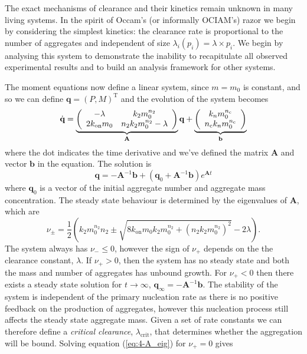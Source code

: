 The exact mechanisms of clearance and their kinetics remain unknown in many living systems. In the spirit of Occam's (or informally OCIAM's) razor we begin by considering the simplest kinetics: the clearance rate is proportional to the number of aggregates and independent of size $\lambda_i(p_i)=\lambda \times p_i$. We begin by analysing this system to demonstrate the inability to recapitulate all observed experimental results and to build an analysis framework for other systems.


The moment equations now define a linear system, since $m=m_0$ is constant, and so we can define $\textbf{q}=(P, M)^\text{T}$ and the evolution of the system becomes
\begin{equation}
    \dot{\textbf{q}} =
    \underbrace{\left(
    \begin{array}{cc}
    -\lambda & k_2 m_0^{n_2} \\
    2 k_\text{on}m_0 & n_2 k_2 m_0^{n_2}-\lambda  \\
    \end{array}
    \right)}
    _{\textbf{A}}
    \textbf{q}
    +
    \underbrace{\left(
    \begin{array}{c}
    k_n m_0^{n_{\mathrm{c}}} \\
    n_{\mathrm{c}} k_n m_0^{n_{\mathrm{c}}} \\
    \end{array}
    \right)}
    _{\textbf{b}}
    \label{eq:4-momentEvomatform}
\end{equation}
where the dot indicates the time derivative and we've defined the matrix $\textbf{A}$ and vector ${\textbf{b}}$ in the equation. The solution is 
\begin{equation}
    \textbf{q} = -\textbf{A}^{-1}\textbf{b}+\left(\textbf{q}_0+\textbf{A}^{-1}\textbf{b}\right)e^{\textbf{A}t}
    \label{eq:4-momentSolvematform}
\end{equation}
where $\textbf{q}_0$ is a vector of the initial aggregate number and aggregate mass concentration. The steady state behaviour is determined by the eigenvalues of $\textbf{A}$, which are
\begin{equation}
    \nu_{\pm} = \frac{1}{2} \left(k_2 m_0^{n_2} n_2 \pm \sqrt{8 k_\text{on} m_0 k_2 m_0^{n_2} + \left(n_2 k_2 m_0^{n_2}\right)^2} - 2 \lambda \right).
    \label{eq:4-A_eig}
\end{equation}
The system always has $\nu_{-} \leq 0$, however the sign of $\nu_+$ depends on the the clearance constant, $\lambda$. If $\nu_+>0$, then the system has no steady state and both the mass and number of aggregates has unbound growth. For $\nu_+<0$ then there exists a steady state solution for $t\rightarrow\infty$, $\textbf{q}_\infty = -\textbf{A}^{-1}\textbf{b}$. The stability of the system is independent of the primary nucleation rate as there is no positive feedback on the production of aggregates, however this nucleation process still affects the steady state aggregate mass. Given a set of rate constants we can therefore define a \textit{critical clearance}, $\lambda_{\text{crit}}$, that determines whether the aggregation will be bound. Solving equation (\ref{eq:4-A_eig}) for $\nu_+=0$ gives
